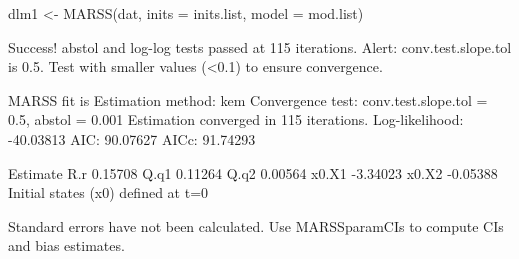 \begin{Schunk}
\begin{Sinput}
 dlm1 <- MARSS(dat, inits = inits.list, model = mod.list)
\end{Sinput}
\begin{Soutput}
Success! abstol and log-log tests passed at 115 iterations.
Alert: conv.test.slope.tol is 0.5.
Test with smaller values (<0.1) to ensure convergence.

MARSS fit is
Estimation method: kem 
Convergence test: conv.test.slope.tol = 0.5, abstol = 0.001
Estimation converged in 115 iterations. 
Log-likelihood: -40.03813 
AIC: 90.07627   AICc: 91.74293   
 
      Estimate
R.r    0.15708
Q.q1   0.11264
Q.q2   0.00564
x0.X1 -3.34023
x0.X2 -0.05388
Initial states (x0) defined at t=0

Standard errors have not been calculated. 
Use MARSSparamCIs to compute CIs and bias estimates.
\end{Soutput}
\end{Schunk}
